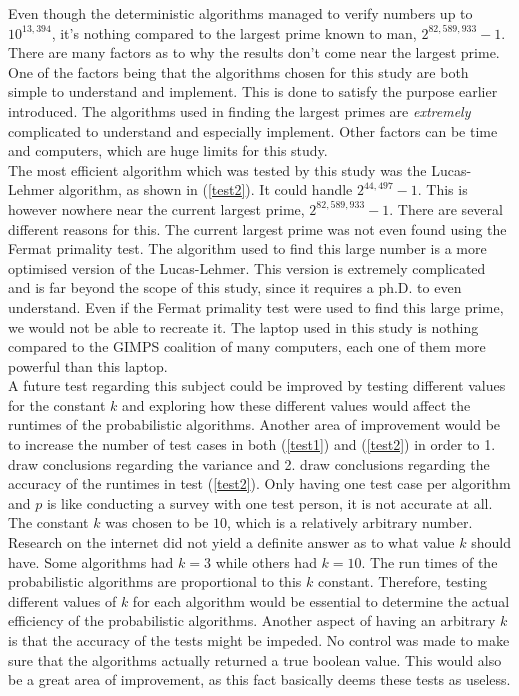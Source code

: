 \documentclass[main.tex]{subfiles}
\begin{document}
Even though the deterministic algorithms managed to verify numbers up to
$10^{13,394}$, it's nothing compared to the largest prime known to man,
$2^{82,589,933} - 1$. There are many factors as to why the results don't come
near the largest prime. One of the factors being that the algorithms chosen for
this study are both simple to understand and implement. This is done to satisfy
the purpose earlier introduced. The algorithms used in finding the largest
primes are \emph{extremely} complicated to understand and especially implement.
Other factors can be time and computers, which are huge limits for this study. \\

The most efficient algorithm which was tested by this study was the Lucas-Lehmer
algorithm, as shown in (\ref{test2}). It could handle $2^{44,497}-1$. This is
however nowhere near the current largest prime, $2^{82,589,933}-1$. There are
several different reasons for this. The current largest prime was not even found
using the Fermat primality test. The algorithm used to find this large number is
a more optimised version of the Lucas-Lehmer. This version is extremely
complicated and is far beyond the scope of this study, since it requires a ph.D.
to even understand. Even if the Fermat primality test were used to find this
large prime, we would not be able to recreate it. The laptop used in this study
is nothing compared to the GIMPS coalition of many computers, each
one of them more powerful than this laptop. \\

A future test regarding this subject could be improved by testing different
values for the constant $k$ and exploring how these different values would
affect the runtimes of the probabilistic algorithms. Another area of improvement
would be to increase the number of test cases in both (\ref{test1}) and
(\ref{test2}) in order to 1. draw conclusions regarding the variance and 2. draw
conclusions regarding the accuracy of the runtimes in test (\ref{test2}). Only
having one test case per algorithm and $p$ is like conducting a survey with one
test person, it is not accurate at all. \\

The constant $k$ was chosen to be $10$, which is a relatively arbitrary number.
Research on the internet did not yield a definite answer as to what value $k$
should have. Some algorithms had $k = 3$ while others had $k = 10$. The run
times of the probabilistic algorithms are proportional to this $k$ constant.
Therefore, testing different values of $k$ for each algorithm would be essential
to determine the actual efficiency of the probabilistic algorithms. Another
aspect of having an arbitrary $k$ is that the accuracy of the tests might be
impeded. No control was made to make sure that the algorithms actually returned
a true boolean value. This would also be a great area of improvement, as this
fact basically deems these tests as useless. \\
\end{document}
